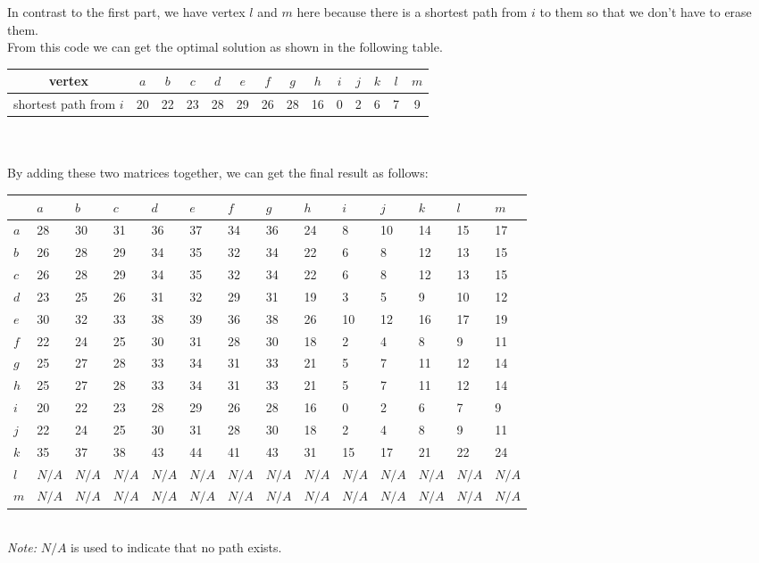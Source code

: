 \documentclass[11pt]{scrreprt}
\begin{document}
In contrast to the first part, we have vertex $l$ and $m$ here because there is a shortest path from $i$ to them so that we don't have to erase them.\\

From this code we can get the optimal solution as shown in the following table.\\
\begin{tabular}{|c|c|c|c|c|c|c|c|c|c|c|c|c|c|}
	\hline vertex & $a$   &  $b$ & $c$ & $d$ & $e$ & $f$ & $g$ & $h$ & $i$  & $j$ & $k$ & $l$ & $m$   \\
	\hline shortest path from $i$ & 20 & 22 & 23 & 28 & 29 & 26 & 28 & 16 & 0 & 2 & 6 & 7 & 9 \\
	\hline
\end{tabular} \\
\bigskip\\
By adding these two matrices together, we can get the final result as follows:
\begin{tabularx}{\textwidth\center}{|l|X|X|X|X|X|X|X|X|X|X|X|X|X|}
\hline  	& $a$ &  $b$ & $c$ & $d$ & $e$ & $f$ & $g$ & $h$ & $i$  & $j$ & $k$ & $l$ & $m$\\
\hline $a$ &	28 &	30 &	31 &	36 &	37 &	34 &	36 &	24 &	8 &	10 &	14 &	15 &	17\\
\hline $b$ &	26 &	28 &	29 &	34 &	35 &	32 &	34 &	22 &	6 &	8 &	12 &	13 &	15\\
\hline $c$ &	26 &	28 &	29 &	34 &	35 &	32 &	34 &	22 &	6 &	8 &	12 &	13 &	15\\
\hline $d$ &	23 &	25 &	26 &	31 &	32 &	29 &	31 &	19 &	3 &	5 &	9 &	10 &	12\\
\hline $e$ &	30 &	32 &	33 &	38 &	39 &	36 &	38 &	26 &	10 &	12 &	16 &	17 &	19\\
\hline $f$ &	22 &	24 &	25 &	30 &	31 &	28 &	30 &	18 &	2 &	4 &	8 &	9 &	11\\
\hline $g$ &	25 &	27 &	28 &	33 &	34 &	31 &	33 &	21 &	5 &	7 &	11 &	12 &	14\\
\hline $h$ &	25 &	27 &	28 &	33 &	34 &	31 &	33 &	21 &	5 &	7 &	11 &	12 &	14\\
\hline $i$ &	20 &	22 &	23 &	28 &	29 &	26 &	28 &	16 &	0 &	2 &	6 &	7 &	9\\
\hline $j$ &	22 &	24 &	25 &	30 &	31 &	28 &	30 &	18 &	2 &	4 &	8 &	9 &	11\\
\hline $k$ &	35 &	37 &	38 &	43 &	44 &	41 &	43 &	31 &	15 &	17 &	21 &	22 &	24\\
\hline $l$ &	$N/A$ &	$N/A$ &	$N/A$ &	$N/A$ &	$N/A$ &	$N/A$ &	$N/A$ &	$N/A$ &	$N/A$ &	$N/A$ &	$N/A$ &	$N/A$ &	$N/A$\\
\hline $m$ &	$N/A$ &	$N/A$ &	$N/A$ &	$N/A$ &	$N/A$ &	$N/A$ &	$N/A$ &	$N/A$ &	$N/A$ &	$N/A$ &	$N/A$ &	$N/A$ &	$N/A$\\
\hline
\end{tabularx} \\

{\it Note:} $N/A$ is used to indicate that no path exists.
\end{document}
